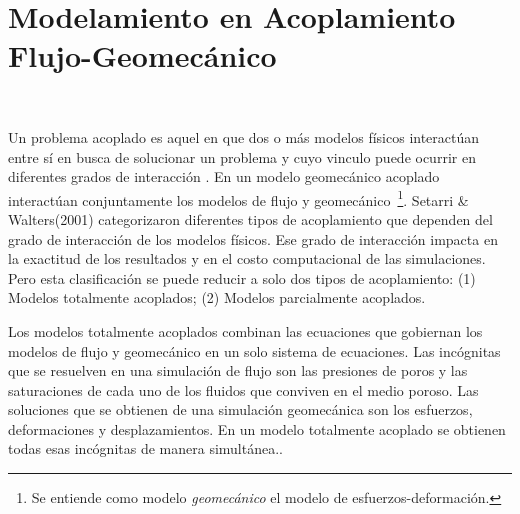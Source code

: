 %





\chapter{Modelamiento en Acoplamiento Flujo-Geomecánico}~\hypertarget{chapter_03}{}
\label{ch:chapter_03}

Un problema acoplado es aquel en que dos o más modelos físicos interactúan entre sí en busca de solucionar un problema y cuyo vinculo puede ocurrir en diferentes grados de interacción \cite{Tran2005}. En un modelo geomecánico acoplado interactúan conjuntamente los modelos de flujo y geomecánico~\footnote{Se entiende como modelo \textit{geomecánico} el modelo de esfuerzos-deformación.}. Setarri \& Walters(2001) \cite{Settari2001} categorizaron diferentes tipos de acoplamiento que dependen del grado de interacción de los modelos físicos. Ese grado de interacción impacta en la exactitud de los resultados y en el costo computacional de las simulaciones. Pero esta clasificación se puede reducir a solo dos tipos de acoplamiento: (1) Modelos totalmente acoplados; (2) Modelos parcialmente acoplados.\bigskip

Los modelos totalmente acoplados combinan las ecuaciones que gobiernan los modelos de flujo y geomecánico en un solo sistema de ecuaciones. Las incógnitas que se resuelven en una simulación de flujo son las presiones de poros y las saturaciones de cada uno de los fluidos que conviven en el medio poroso. Las soluciones que se obtienen de una simulación geomecánica son los esfuerzos, deformaciones y desplazamientos. En un modelo totalmente acoplado se obtienen todas esas incógnitas de manera simultánea.\bigskip.

